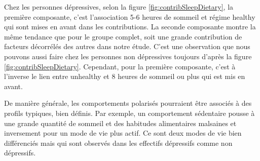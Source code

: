 Chez les personnes dépressives, selon la figure \ref{fig:contribSleepDietary},  la première composante, c’est l’association 5-6 heures de sommeil et régime healthy qui sont mises en avant dans les contributions. La seconde composante montre la même tendance que pour le groupe complet, soit une grande contribution de facteurs décorrélés des autres dans notre étude. C’est une observation que nous pouvons aussi faire chez les personnes non dépressives toujours d’après la figure \ref{fig:contribSleepDietary}. Cependant, pour la première composante, c’est à l’inverse le lien entre unhealthy et 8 heures de sommeil ou plus qui est mis en avant.

De manière générale, les comportements polarisés pourraient être associés à des profils typiques, bien définis. Par exemple, un comportement sédentaire pousse à une grande quantité de sommeil et des habitudes alimentaires malsaines et inversement pour un mode de vie plus actif. Ce sont deux modes de vie bien différenciés mais qui sont observés dans les effectifs dépressifs comme non dépressifs.
